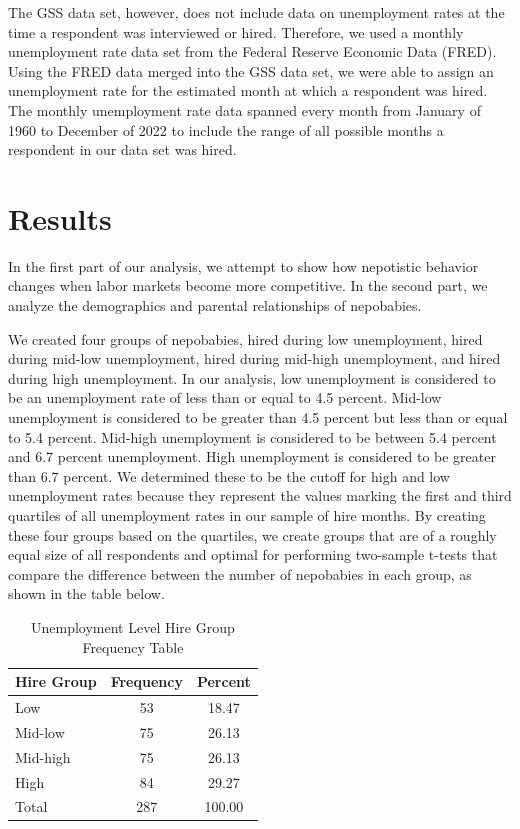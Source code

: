 \documentclass[12pt]{article}
\begin{document}
The GSS data set, however, does not include data on unemployment rates at the time a respondent was interviewed or hired. Therefore, we used a monthly unemployment rate data set from the Federal Reserve Economic Data (FRED). Using the FRED data merged into the GSS data set, we were able to assign an unemployment rate for the estimated month at which a respondent was hired. The monthly unemployment rate data spanned every month from January of 1960 to December of 2022 to include the range of all possible months a respondent in our data set was hired. 


\section{Results}
\label{sec:result}

In the first part of our analysis, we attempt to show how nepotistic behavior changes when labor markets become more competitive. In the second part, we analyze the demographics and parental relationships of nepobabies.


We created four groups of nepobabies, hired during low unemployment, hired during mid-low unemployment, hired during mid-high unemployment, and hired during high unemployment. In our analysis, low unemployment is considered to be an unemployment rate of less than or equal to 4.5 percent. Mid-low unemployment is considered to be greater than 4.5 percent but less than or equal to 5.4 percent. Mid-high unemployment is considered to be between 5.4 percent and 6.7 percent unemployment. High unemployment is considered to be greater than 6.7 percent. We determined these to be the cutoff for high and low unemployment rates because they represent the values marking the first and third quartiles of all unemployment rates in our sample of hire months. By creating these four groups based on the quartiles, we create groups that are of a roughly equal size of all respondents and optimal for performing two-sample t-tests that compare the difference between the number of nepobabies in each group, as shown in the table below.

\begin{table}[ht]
\centering
\begin{tabular}{l|cc}
Hire Group & Frequency & Percent \\
\hline 
Low & 53 & 18.47 \\
Mid-low & 75 & 26.13 \\
Mid-high & 75 & 26.13 \\
High & 84 & 29.27 \\
\hline 
Total & 287 & 100.00
\end{tabular}
\caption{Unemployment Level Hire Group Frequency Table}
\label{tab:mytable}
\end{table}
\end{document}
